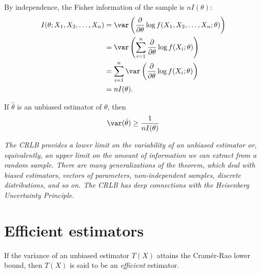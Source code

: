 By independence, the Fisher information of the sample is $nI(\theta)$:
\begin{align*}
I(\theta;X_1,X_2,\ldots,X_n) 
	& = \var\left(\frac{\partial}{\partial\theta}\log f(X_1,X_2,\ldots,X_n;\theta)\right) \\
	& = \var\left(\sum_{i=1}^n \frac{\partial}{\partial\theta}\log f(X_i;\theta)\right) \\
	& = \sum_{i=1}^n \var\left(\frac{\partial}{\partial\theta}\log f(X_i;\theta)\right) \\
	& = nI(\theta).
\end{align*}

\begin{theorem}\label{thm:crlb}
If $\hat{\theta}$ is an unbiased estimator of $\theta$, then
\[
\var(\hat{\theta}) \geq \frac{1}{nI(\theta)}
\]
\end{theorem}
\proofomitted

\begin{remark}
\bit
\it The CRLB provides a \emph{lower limit} on the variability of an unbiased estimator or, equivalently, an \emph{upper limit} on the amount of information we can extract from a random sample.
\it There are many generalizations of the theorem, which deal with biased estimators, vectors of parameters, non-independent samples, discrete distributions, and so on.
\it The CRLB has deep connections with the \emph{Heisenberg Uncertainty Principle}.
\eit
\end{remark}


\section{Efficient estimators}

\begin{definition}
If the variance of an unbiased estimator $T(X)$ attains the Cram\'{e}r-Rao lower bound, then $T(X)$ is said to be an \emph{efficient} estimator.
\end{definition}

